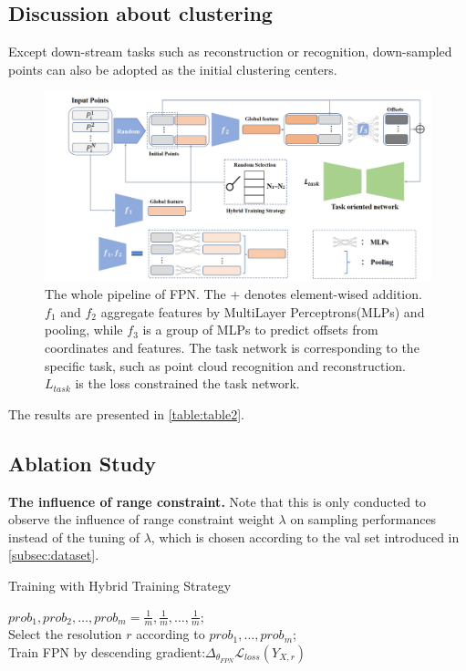 \documentclass[a4paper,10pt]{article}
\begin{document}
\begin{multicols}{2}
\subsection{Discussion about clustering}
Except down-stream tasks such as reconstruction or recognition, down-sampled points can also be adopted as the initial clustering centers.
\begin{figure}
\centering
 \includegraphics[width=\linewidth]{images/fig2.png}
 \captionsetup{justification=justified, labelsep=period}
 \caption{The whole pipeline of FPN. The + denotes element-wised addition. $f_1$ and $f_2$ aggregate features by MultiLayer Perceptrons(MLPs) and pooling, while $f_3$ is a group of MLPs to predict offsets from coordinates and features. The task network is corresponding to the speciﬁc task, such as point cloud recognition and reconstruction. $L_{task}$ is the loss constrained the task network.}
\label{fig:fig2}
\end{figure}

The results are presented in \autoref{table:table2}.

\subsection{Ablation Study}
\textbf{The influence of range constraint.} Note that this is only conducted to observe the inﬂuence of range constraint weight $\lambda$ on sampling performances instead of the tuning of $\lambda$, which is chosen according to the val set introduced in \autoref{subsec:dataset}.

\begin{algorithm}[H]
\label{alg:algo-1}
\SetAlgoCaptionSeparator{}
\caption{Training with Hybrid Training Strategy}
\SetAlgoNoLine
{}
$prob_1, prob_2, \ldots, prob_m = \frac{1}{m}, \frac{1}{m}, \ldots, \frac{1}{m};$\\
{
Select the resolution $r$ according to $prob_1,\ldots, prob_m$;\\Train FPN by descending gradient:$\Delta_{\theta_{FPN}}\mathcal{L}_{loss}\left(Y_{X, r}\right)$\\
}
\end{algorithm}


\end{multicols}
\end{document}
